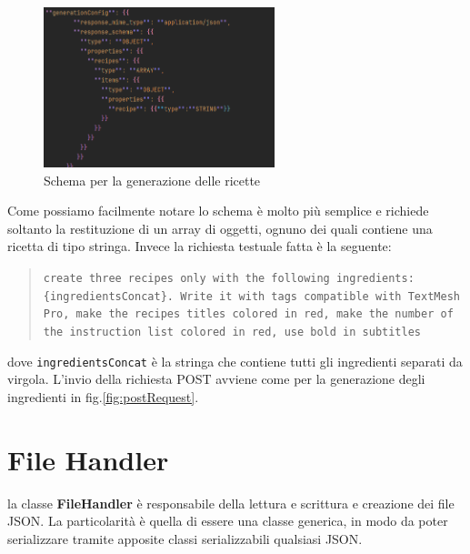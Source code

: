 \begin{figure}[H]
    \centering
    \includegraphics[width=0.6\textwidth,height=\textheight,keepaspectratio]{figures/chapter_1/recipeSchema.png}
    \caption{Schema per la generazione delle ricette}
    \label{fig:recipeSchema}
\end{figure}

Come possiamo facilmente notare lo schema è molto più semplice e richiede soltanto la restituzione di un array di oggetti, ognuno dei quali contiene una ricetta di tipo stringa.
Invece la richiesta testuale fatta è la seguente:
\begin{quote}
    \texttt{create three recipes only with the following ingredients: \{ingredientsConcat\}. Write it with tags compatible with TextMesh Pro, make the recipes titles colored in red, make the number of the instruction list colored in red, use bold in subtitles}
\end{quote}dove \texttt{ingredientsConcat} è la stringa che contiene tutti gli ingredienti separati da virgola.
L'invio della richiesta POST avviene come per la generazione degli ingredienti in fig.\ref{fig:postRequest}.

\section{File Handler}
la classe \textbf{FileHandler} è responsabile della lettura e scrittura e creazione dei file JSON. La particolarità è quella di essere una classe generica, in modo da poter serializzare tramite apposite classi serializzabili qualsiasi JSON.

